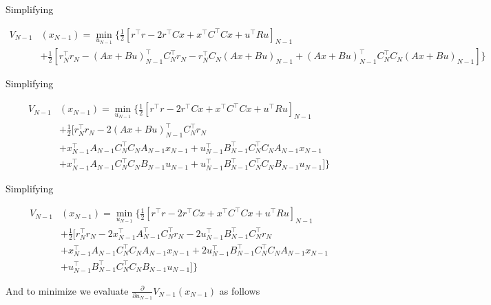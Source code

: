 \documentclass[11pt,letterpaper,onecolumn,notitlepage]{article}
\begin{document}
  Simplifying

  \begin{equation*}
    \begin{split}
      V_{N-1}&(x_{N-1})=\min_{u_{N-1}}\biggr\{\frac{1}{2}\left[r^{\top}r-2r^{\top}Cx+x^{\top}C^{\top}Cx+u^{\top}Ru\right]_{N-1} \\
      &+\frac{1}{2}\left[r_{N}^{\top}r_{N}-(Ax+Bu)_{N-1}^{\top}C_{N}^{\top}r_{N}-r_{N}^{\top}C_{N}(Ax+Bu)_{N-1}+(Ax+Bu)_{N-1}^{\top}C_{N}^{\top}C_{N}(Ax+Bu)_{N-1}\right]\biggr\}
    \end{split}
  \end{equation*}

  Simplifying

  \begin{equation*}
    \begin{split}
      V_{N-1}&(x_{N-1})=\min_{u_{N-1}}\biggr\{\frac{1}{2}\left[r^{\top}r-2r^{\top}Cx+x^{\top}C^{\top}Cx+u^{\top}Ru\right]_{N-1} \\
      &+\frac{1}{2}\bigr[r_{N}^{\top}r_{N}-2(Ax+Bu)_{N-1}^{\top}C_{N}^{\top}r_{N} \\
      &+x_{N-1}^{\top}A_{N-1}C_{N}^{\top}C_{N}A_{N-1}x_{N-1}
      +u_{N-1}^{\top}B_{N-1}^{\top}C_{N}^{\top}C_{N}A_{N-1}x_{N-1} \\
      &+x_{N-1}^{\top}A_{N-1}C_{N}^{\top}C_{N}B_{N-1}u_{N-1}
      +u_{N-1}^{\top}B_{N-1}^{\top}C_{N}^{\top}C_{N}B_{N-1}u_{N-1}
      \bigr]\biggr\}
    \end{split}
  \end{equation*}

  Simplifying

  \begin{equation*}
    \begin{split}
      V_{N-1}&(x_{N-1})=\min_{u_{N-1}}\biggr\{\frac{1}{2}\left[r^{\top}r-2r^{\top}Cx+x^{\top}C^{\top}Cx+u^{\top}Ru\right]_{N-1} \\
      &+\frac{1}{2}\bigr[r_{N}^{\top}r_{N}
      -2x_{N-1}^{\top}A_{N-1}^{\top}C_{N}^{\top}r_{N}-2u_{N-1}^{\top}B_{N-1}^{\top}C_{N}^{\top}r_{N} \\
      &+x_{N-1}^{\top}A_{N-1}C_{N}^{\top}C_{N}A_{N-1}x_{N-1}
      +2u_{N-1}^{\top}B_{N-1}^{\top}C_{N}^{\top}C_{N}A_{N-1}x_{N-1} \\
      &+u_{N-1}^{\top}B_{N-1}^{\top}C_{N}^{\top}C_{N}B_{N-1}u_{N-1}
      \bigr]\biggr\}
    \end{split}
  \end{equation*}

  And to minimize we evaluate $\frac{\partial}{\partial u_{N-1}}V_{N-1}(x_{N-1})$ as follows
\end{document}
